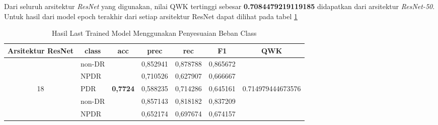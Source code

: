 Dari seluruh arsitektur \emph{ResNet} yang digunakan, nilai QWK tertinggi sebesar \textbf{0.7084479219119185} didapatkan dari arsitektur \emph{ResNet-50}. Untuk hasil dari model epoch terakhir dari setiap arsitektur ResNet dapat dilihat pada tabel \ref{tb:HasilLastClassWeight}

\pagebreak

\begin{table}[hbtp]
	\begin{center}
		\caption{Hasil Last Trained Model Menggunakan Penyesuaian Beban Class}
		\label{tb:HasilLastClassWeight}
		\begin{tabular}{|c|l|c|l|l|l|c|}
			\hline
			\rowcolor[HTML]{C0C0C0} 
			Arsitektur ResNet     & \multicolumn{1}{c|}{\cellcolor[HTML]{C0C0C0}class} & acc                      & \multicolumn{1}{c|}{\cellcolor[HTML]{C0C0C0}prec} & \multicolumn{1}{c|}{\cellcolor[HTML]{C0C0C0}rec} & \multicolumn{1}{c|}{\cellcolor[HTML]{C0C0C0}F1} & QWK                                  \\ \hline
			& non-DR                                             &                          & 0,852941                                          & 0,878788                                         & 0,865672                                        &                                      \\ \cline{2-2} \cline{4-6}
			& NPDR                                               &                          & 0,710526                                          & 0,627907                                         & 0,666667                                        &                                      \\ \cline{2-2} \cline{4-6}
			\multirow{-3}{*}{18}  & PDR                                                & \multirow{-3}{*}{\textbf{0,7724}} & 0,588235                                 & 0,714286                                         & 0,645161                                        & \multirow{-3}{*}{0.714979444673576}  \\ \hline
			& non-DR                                             &                          & 0,857143                                          & 0,818182                                         & 0,837209                                        &                                      \\ \cline{2-2} \cline{4-6}
			& NPDR                                               &                          & 0,652174                                          & 0,697674                                         & 0,674157                                        &                                      \\ \cline{2-2} \cline{4-6}

\end{tabular}
\end{center}
\end{table}
